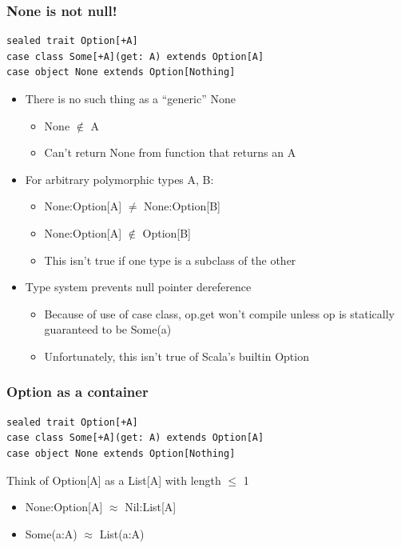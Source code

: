 \documentclass{beamer}
\begin{document}
\begin{frame}[fragile,t]
  \frametitle{{\ttfamily None} is not {\ttfamily null}!}
\begin{lstlisting}
sealed trait Option[+A]
case class Some[+A](get: A) extends Option[A]
case object None extends Option[Nothing]
\end{lstlisting}
  \begin{itemize}
    \item There is no such thing as a ``generic'' {\ttfamily None}
      \begin{itemize}
        \item {\ttfamily None} $\not\in$ {\ttfamily A}
        \item Can't return {\ttfamily None} from function that returns an {\ttfamily A}
      \end{itemize}
    \item For arbitrary polymorphic types {\ttfamily A}, {\ttfamily B}:
      \begin{itemize}
        \item {\ttfamily None:Option[A]} $\neq$ {\ttfamily None:Option[B]}
        \item {\ttfamily None:Option[A]} $\not\in$ {\ttfamily Option[B]}
        \item This isn't true if one type is a subclass of the other
      \end{itemize}
    \item Type system prevents null pointer dereference
      \begin{itemize}
        \item Because of use of case class, {\ttfamily op.get} won't compile unless {\ttfamily op} is statically guaranteed to be {\ttfamily Some(a)}
        \item Unfortunately, this isn't true of Scala's builtin {\ttfamily Option}
      \end{itemize}
  \end{itemize}
\end{frame}

\begin{frame}[fragile,t]
  \frametitle{{\ttfamily Option} as a container}
\begin{lstlisting}
sealed trait Option[+A]
case class Some[+A](get: A) extends Option[A]
case object None extends Option[Nothing]
\end{lstlisting}
  Think of {\ttfamily Option[A]} as a {\ttfamily List[A]} with length $\le$ 1
  \begin{itemize}
    \item {\ttfamily None:Option[A]} $\approx$ {\ttfamily Nil:List[A]}
    \item {\ttfamily Some(a:A)} $\approx$ {\ttfamily List(a:A)}
  \end{itemize}
\end{frame}
\end{document}
